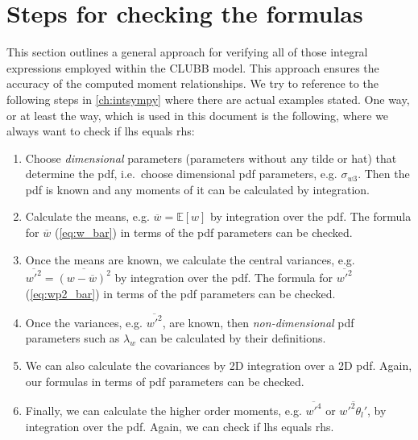 \section{Steps for checking the formulas}\label{sec:steps_for_checking}

This section outlines a general approach for verifying all of those integral expressions
employed within the \gls{CLUBB} model.
This approach ensures the accuracy of the computed moment relationships.
We try to reference to the following steps in \cref{ch:intsympy} where there are actual examples stated.
One way, or at least the way, which is used in this document is the following,
where we always want to check if \gls{lhs} equals \gls{rhs}:

\begin{enumerate}
    \item\label{itm:checkingstep_1}
    Choose \emph{dimensional} parameters (parameters without any tilde or hat) that determine the \gls{pdf},
    i.e.\ choose dimensional \gls{pdf} parameters, e.g. $\sigma_{w 3}$.
    Then the \gls{pdf} is known and any moments of it can be calculated by integration.

    \item\label{itm:checkingstep_2}
    Calculate the means, e.g. $\overline{w} = \mathbb{E}[w]$ by integration over the \gls{pdf}.
    The formula for $\overline{w}$ (\cref{eq:w_bar}) in terms of the \gls{pdf} parameters can be checked.

    \item\label{itm:checkingstep_3}
    Once the means are known, we calculate the central variances,
    e.g.  $\overline{w'^2} = \overline{(w-\overline{w})^2}$ by integration over the \gls{pdf}.
    The formula for $\overline{w'^2}$ (\cref{eq:wp2_bar}) in terms of the \gls{pdf} parameters can be checked.

    \item\label{itm:checkingstep_4}
    Once the variances, e.g. $\overline{w'^2}$, are known,
    then \emph{non-dimensional} \gls{pdf} parameters such as $\lambda_w$ can be calculated by their definitions.

    \item\label{itm:checkingstep_5}
    We can also calculate the covariances by 2D integration over a 2D \gls{pdf}.
    Again, our formulas in terms of \gls{pdf} parameters can be checked.

    \item\label{itm:checkingstep_6}
    Finally, we can calculate the higher order moments,
    e.g. $\overline{w'^4}$ or $\overline{w'^2 \theta_l'}$, by integration over the \gls{pdf}.
    Again, we can check if \gls{lhs} equals \gls{rhs}.


\end{enumerate}
